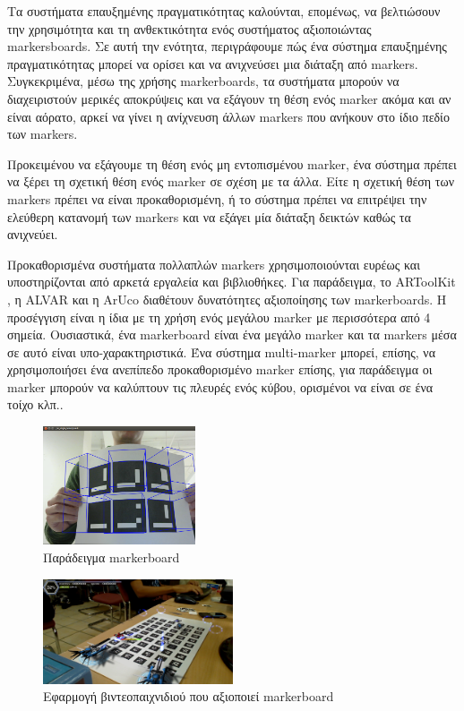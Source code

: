 Τα συστήματα επαυξημένης πραγματικότητας καλούνται, επομένως, να βελτιώσουν την χρησιμότητα και τη ανθεκτικότητα ενός συστήματος αξιοποιώντας markersboards. Σε αυτή την ενότητα, περιγράφουμε πώς ένα σύστημα επαυξημένης πραγματικότητας μπορεί να ορίσει και να ανιχνεύσει μια διάταξη από markers. Συγκεκριμένα, μέσω της χρήσης markerboards, τα συστήματα μπορούν να διαχειριστούν μερικές αποκρύψεις και να εξάγουν τη θέση ενός marker ακόμα και αν είναι αόρατο, αρκεί να γίνει η ανίχνευση άλλων markers που ανήκουν στο ίδιο πεδίο των markers. 


Προκειμένου να εξάγουμε τη θέση ενός μη εντοπισμένου marker, ένα σύστημα πρέπει να ξέρει τη σχετική θέση ενός marker σε σχέση με τα άλλα. Είτε η σχετική θέση των markers πρέπει να είναι προκαθορισμένη, ή το σύστημα πρέπει να επιτρέψει την ελεύθερη κατανομή των markers και να εξάγει μία διάταξη δεικτών καθώς τα ανιχνεύει. 


Προκαθορισμένα συστήματα πολλαπλών markers χρησιμοποιούνται ευρέως και υποστηρίζονται από αρκετά εργαλεία και βιβλιοθήκες. 
Για παράδειγμα, το ARToolKit \cite{artoolkit}, η ALVAR \cite{alvar} και η ArUco\cite{aruco} διαθέτουν δυνατότητες αξιοποίησης των markerboards. Η προσέγγιση είναι η ίδια με τη χρήση ενός μεγάλου marker με περισσότερα από 4 σημεία. Ουσιαστικά, ένα markerboard είναι ένα μεγάλο marker και τα markers μέσα σε αυτό είναι υπο-χαρακτηριστικά. Ένα σύστημα multi-marker μπορεί, επίσης, να χρησιμοποιήσει ένα ανεπίπεδο προκαθορισμένο marker επίσης, για παράδειγμα οι marker μπορούν να καλύπτουν τις πλευρές ενός κύβου, ορισμένοι να είναι σε ένα τοίχο κλπ.\cite{uematsu2005ar}.


\begin{figure}[H]
    \centering
    \includegraphics[width=0.4\textwidth]{Files/Figures/markerboard_example.png}
    \caption[Παράδειγμα markerboard]{Παράδειγμα markerboard}
    \label{fig:coordinatesDiagram}
\end{figure}


\begin{figure}[H]
    \centering
    \includegraphics[width=0.5\textwidth]{Files/Figures/sc2.png}
    \caption[Εφαρμογή βιντεοπαιχνιδιού που αξιοποιεί markerboard]{Εφαρμογή βιντεοπαιχνιδιού που αξιοποιεί markerboard}
    \label{fig:markerboard_game}
\end{figure}




